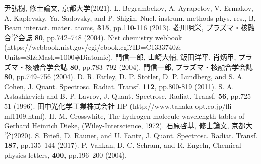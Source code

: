\begin{thebibliography}{99}
     尹弘樹, 修士論文, 京都大学(2021).
     L. Begrambekov, A. Ayrapetov, V. Ermakov, A. Kaplevsky, Ya. Sadovsky, and P. Shigin, Nucl. instrum. methods phys. res., B, Beam interact. mater. atoms, \textbf{315}, pp.110-116 (2013).
     菱川明栄, プラズマ・核融合学会誌 \textbf{80}, pp.742–748 (2004).
     Nist chemistry webbook (https://webbook.nist.gov/cgi/cbook.cgi?ID=C1333740\&\\Units=SI\&Mask=1000\#Diatomic).
     門信一郎, 山崎大輔, 飯田洋平, 肖炳甲, プラズマ・核融合学会誌 \textbf{80}, pp.783–792 (2004).
     門信一郎, プラズマ・核融合学会誌 \textbf{80}, pp.749–756 (2004).
     D. R. Farley, D. P. Stotler, D. P. Lundberg, and S. A. Cohen, J. Quant. Spectrosc. Radiat. Transf. \textbf{112}, pp.800-819 (2011).
      S. A. Astashkevich and B. P. Lavrov, J. Quant. Spectrosc. Radiat. Transf. \textbf{56}, pp.725–51 (1996).
     田中光化学工業株式会社 HP (http://www.tanaka-opt.co.jp/fli-ml1109.html).
     H. M. Crosswhite, The hydrogen molecule wavelength tables of Gerhard Heinrich Dieke, (Wiley-Interscience, 1972).
     石原啓基, 修士論文, 京都大学(2020).
     S. Briefi, D. Rauner, and U. Fantz, J. Quant. Spectrosc. Radiat. Transf. \textbf{187}, pp.135–144 (2017).
     P. Vankan, D. C. Schram, and R. Engeln, Chemical physics letters, \textbf{400}, pp.196–200 (2004).
\end{thebibliography}